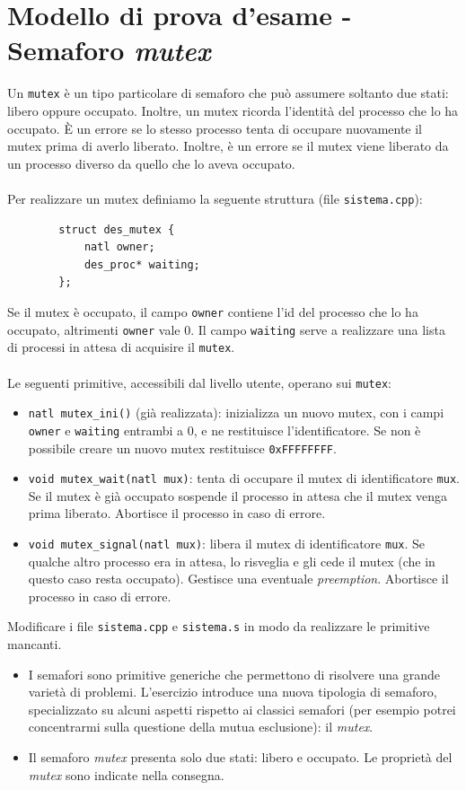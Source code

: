 \part{Modello di prova d'esame - Semaforo \emph{mutex}}

\small
\begin{framed}
	\noindent Un {\tt mutex} \`e un tipo particolare di semaforo che pu\`o assumere soltanto
	due stati: libero oppure occupato.  Inoltre, un mutex ricorda l'identit\`a del
	processo che lo ha occupato. \`E un errore se lo stesso processo tenta di
	occupare nuovamente il mutex prima di averlo liberato. Inoltre, \`e un errore
	se il mutex viene liberato da un processo diverso da quello che lo aveva
	occupato.\\\\Per realizzare un mutex definiamo la seguente struttura (file {\tt sistema.cpp}):
	
	\begin{verbatim}
		struct des_mutex {
			natl owner;
			des_proc* waiting;
		};
	\end{verbatim}
	\noindent Se il mutex \`e occupato, il campo {\tt owner} contiene l'id del processo che
	lo ha occupato, altrimenti {\tt owner} vale 0.  Il campo {\tt waiting} serve a
	realizzare una lista di processi in attesa di acquisire il {\tt mutex}.\\\\Le seguenti primitive, accessibili dal livello utente, operano sui {\tt mutex}:
	\begin{itemize}
		\item \verb|natl mutex_ini()| (gi\`a realizzata): inizializza
		un nuovo mutex, con i campi {\tt owner} e {\tt waiting} entrambi a 0, e ne
		restituisce l'identificatore. Se non \`e possibile creare un nuovo mutex
		restituisce {\tt 0xFFFFFFFF}.
		\item \verb|void mutex_wait(natl mux)|: tenta di occupare il
		mutex di identificatore {\tt mux}.  Se il mutex \`e gi\`a occupato sospende il
		processo in attesa che il mutex venga prima liberato.  Abortisce il processo in
		caso di errore.
		\item \verb|void mutex_signal(natl mux)|: libera il mutex di
		identificatore {\tt mux}.  Se qualche altro processo era in attesa, lo
		risveglia e gli cede il mutex (che in questo caso resta occupato). Gestisce una
		eventuale {\em preemption}.  Abortisce il processo in caso di errore.
	\end{itemize}
	\noindent Modificare i file \verb|sistema.cpp| e \verb|sistema.s| in modo da realizzare
	le primitive mancanti.\end{framed}
\normalsize 
\begin{itemize}
	\item I semafori sono primitive generiche che permettono di risolvere una grande varietà di problemi. L'esercizio introduce una nuova tipologia di semaforo, specializzato su alcuni aspetti rispetto ai classici semafori (per esempio potrei concentrarmi sulla questione della mutua esclusione): il \emph{mutex}.
	\item Il semaforo \emph{mutex} presenta solo due stati: libero e occupato. Le proprietà del \emph{mutex} sono indicate nella consegna.
\end{itemize}

